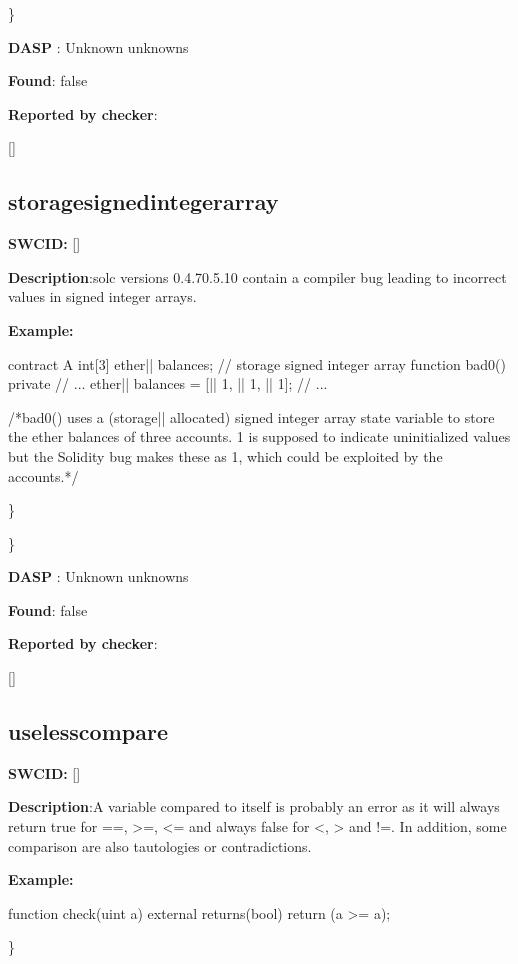 \documentclass{article}
\begin{document}
\} 

\textbf{DASP} : Unknown unknowns

\textbf{Found}: false

\textbf{Reported by checker}: 
\begin{ffcode} 

[]
\end{ffcode} 
\subsection{storage{\textunderscore}signed{\textunderscore}integer{\textunderscore}array} 
\textbf{SWC{\textunderscore}ID:} []

\textbf{Description}:solc versions 0.4.7{\textendash}0.5.10 contain a compiler bug leading to incorrect values in signed integer arrays.


\textbf{Example:} 
\begin{ffcode} 

contract A {
  int[3] ether|\textunderscore| balances; // storage signed integer array
  function bad0() private {
    // ...
    ether|\textunderscore| balances = [|\textendash| 1, |\textendash| 1, |\textendash| 1];
    // ...
  }
}

 /*bad0() uses a (storage|\textendash| allocated) signed integer array state variable to store the ether balances of three accounts. 1 is supposed to indicate uninitialized values but the Solidity bug makes these as 1, which could be exploited by the accounts.*/ 

\end{ffcode} 
\} 

\} 

\textbf{DASP} : Unknown unknowns

\textbf{Found}: false

\textbf{Reported by checker}: 
\begin{ffcode} 

[]
\end{ffcode} 
\subsection{useless{\textunderscore}compare} 
\textbf{SWC{\textunderscore}ID:} []

\textbf{Description}:A variable compared to itself is probably an error as it will always return true for ==, >=, <= and always false for <, > and !=. In addition, some comparison are also tautologies or contradictions.


\textbf{Example:} 
\begin{ffcode} 

function check(uint a) external returns(bool){
    return (a >= a);
}

\end{ffcode} 
\} 
\end{document}
